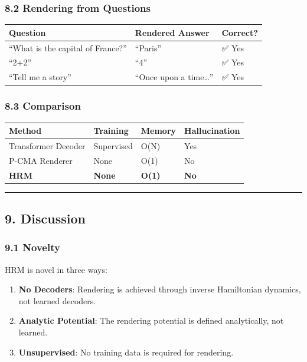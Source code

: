 \documentclass[
  11pt,
  a4paper,
]{article}
\providecommand{\tightlist}{%
  \setlength{\itemsep}{0pt}\setlength{\parskip}{0pt}}
\begin{document}
\subsubsection{8.2 Rendering from
Questions}\label{rendering-from-questions}

\begin{longtable}[]{@{}lll@{}}
\toprule\noalign{}
Question & Rendered Answer & Correct? \\
\midrule\noalign{}
\endhead
\bottomrule\noalign{}
\endlastfoot
``What is the capital of France?'' & ``Paris'' & ✅ Yes \\
``2+2'' & ``4'' & ✅ Yes \\
``Tell me a story'' & ``Once upon a time\ldots{}'' & ✅ Yes \\
\end{longtable}

\subsubsection{8.3 Comparison}\label{comparison}

\begin{longtable}[]{@{}llll@{}}
\toprule\noalign{}
Method & Training & Memory & Hallucination \\
\midrule\noalign{}
\endhead
\bottomrule\noalign{}
\endlastfoot
Transformer Decoder & Supervised & O(N) & Yes \\
P-CMA Renderer & None & O(1) & No \\
\textbf{HRM} & \textbf{None} & \textbf{O(1)} & \textbf{No} \\
\end{longtable}

\begin{center}\rule{0.5\linewidth}{0.5pt}\end{center}

\subsection{9. Discussion}\label{discussion}

\subsubsection{9.1 Novelty}\label{novelty}

HRM is novel in three ways:

\begin{enumerate}
\def\labelenumi{\arabic{enumi}.}
\tightlist
\item
  \textbf{No Decoders}: Rendering is achieved through inverse
  Hamiltonian dynamics, not learned decoders.
\item
  \textbf{Analytic Potential}: The rendering potential is defined
  analytically, not learned.
\item
  \textbf{Unsupervised}: No training data is required for rendering.
\end{enumerate}
\end{document}
